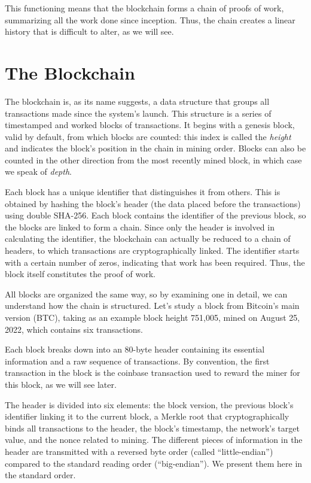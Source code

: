 \documentclass[
  a5paper,
  smalldemyvopaper,10pt,twoside,onecolumn,openright,extrafontsizes,hidelinks]{memoir}
\begin{document}
This functioning means that the blockchain forms a chain of proofs of
work, summarizing all the work done since inception. Thus, the chain
creates a linear history that is difficult to alter, as we will see.

\section*{The Blockchain}\label{la-chauxeene-de-blocs}


The blockchain is, as its name suggests, a data structure that groups
all transactions made since the system's launch. This structure is a
series of timestamped and worked blocks of transactions. It begins with
a genesis block, valid by default, from which blocks are counted: this
index is called the \emph{height} and indicates the block's position in
the chain in mining order. Blocks can also be counted in the other
direction from the most recently mined block, in which case we speak of
\emph{depth}.

Each block has a unique identifier that distinguishes it from others.
This is obtained by hashing the block's header (the data placed before
the transactions) using double SHA-256. Each block contains the
identifier of the previous block, so the blocks are linked to form a
chain. Since only the header is involved in calculating the identifier,
the blockchain can actually be reduced to a chain of headers, to which
transactions are cryptographically linked. The identifier starts with a
certain number of zeros, indicating that work has been required. Thus,
the block itself constitutes the proof of work.

All blocks are organized the same way, so by examining one in detail, we
can understand how the chain is structured. Let's study a block from
Bitcoin's main version (BTC), taking as an example block height 751,005,
mined on August 25, 2022, which contains six transactions.

Each block breaks down into an 80-byte header containing its essential
information and a raw sequence of transactions. By convention, the first
transaction in the block is the coinbase transaction used to reward the
miner for this block, as we will see later.

The header is divided into six elements: the block version, the previous
block's identifier linking it to the current block, a Merkle root that
cryptographically binds all transactions to the header, the block's
timestamp, the network's target value, and the nonce related to mining.
The different pieces of information in the header are transmitted with a
reversed byte order (called ``little-endian'') compared to the standard
reading order (``big-endian''). We present them here in the standard
order.
\end{document}

